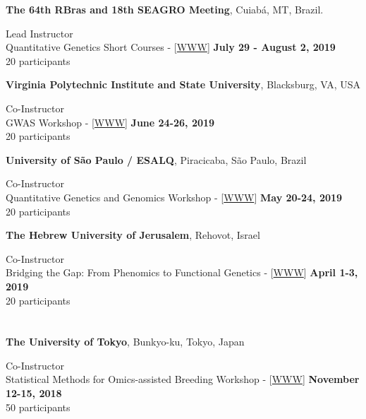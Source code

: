 \documentclass[margin,line,10pt]{res}
\begin{document}
\begin{resume}
{\bf The 64th RBras and 18th SEAGRO Meeting}, Cuiab{\'a}, MT, Brazil.
\vspace{.01pt}

Lead Instructor  \\
    Quantitative Genetics Short Courses - [\textcolor{blue}{\href{http://morotalab.org/RBras2019/RBras2019.html}{WWW}}]
\hfill {\bf  July 29 - August 2, 2019} \\
20 participants 


{\bf Virginia Polytechnic Institute and State University}, Blacksburg, VA, USA
\vspace{.01pt}

Co-Instructor  \\
GWAS Workshop - [\textcolor{blue}{\href{http://morotalab.org/VTGWAS2019/VTGWAS2019.html}{WWW}}]
\hfill {\bf June 24-26, 2019} \\
20 participants 


{\bf University of S\~{a}o Paulo / ESALQ}, Piracicaba, S\~{a}o Paulo, Brazil
\vspace{.01pt}

Co-Instructor  \\
Quantitative Genetics and Genomics Workshop - [\textcolor{blue}{\href{http://morotalab.org/ESALQ2019/ESALQ2019.html}{WWW}}]
\hfill {\bf May 20-24, 2019} \\
20 participants


{\bf The Hebrew University of Jerusalem}, Rehovot, Israel
\vspace{.01pt}

Co-Instructor  \\
Bridging the Gap: From Phenomics to Functional Genetics - [\textcolor{blue}{\href{http://morotalab.org/HUJI2019/HUJI2019.html}{WWW}}]
\hfill {\bf April 1-3, 2019} \\
20 participants

\section{}

{\bf The University of Tokyo}, Bunkyo-ku, Tokyo, Japan
\vspace{.01pt}

Co-Instructor  \\
Statistical Methods for Omics-assisted Breeding Workshop - [\textcolor{blue}{\href{http://morotalab.org/UT2018/UT2018.html}{WWW}}]
\hfill {\bf November 12-15, 2018} \\
50 participants 




\end{resume}
\end{document}
